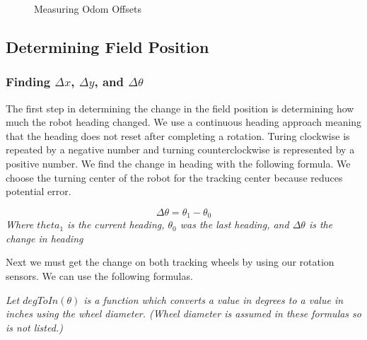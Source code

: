 \documentclass[12pt]{report}
\begin{document}
\def\wheelSize{1.5}
\begin{figure}[h]
 \caption{Measuring Odom Offsets}
 \label{FIG::odom_offsets}
 \centering
 \label{odom_offset_diagram}
\end{figure}


\pagebreak
\subsection{Determining Field Position}
\subsubsection{Finding $\Delta x$, $\Delta y$, and $\Delta\theta$}
The first step in determining the change in the field position is determining how much the robot heading changed. 
We use a continuous heading approach meaning that the heading does not reset after completing a rotation.
Turing clockwise is repeated by a negative number and turning counterclockwise is represented by a positive number.
We find the change in heading with the following formula.
We choose the turning center of the robot for the tracking center because reduces potential error.

$$
    \Delta \theta = \theta_1-\theta_0
$$
\textit{Where $theta_1$ is the current heading, $\theta_0$ was the last heading, and $\Delta \theta$ is the change in heading}

Next we must get the change on both tracking wheels by using our rotation sensors.
We can use the following formulas.

\textit{Let $degToIn(\theta)$ is a function which converts a value in degrees to a value in inches using the wheel diameter. (Wheel diameter is assumed in these formulas so is not listed.)}
\end{document}
